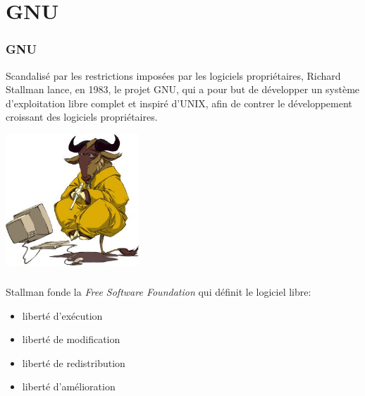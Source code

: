 \documentclass[svgnames,11pt]{beamer}
\begin{document}
\section{GNU}
\begin{frame}
    \frametitle{GNU}

    Scandalisé par les restrictions imposées par les logiciels propriétaires, Richard Stallman lance, en 1983, le projet GNU, qui a pour but de développer un système d'exploitation libre complet et inspiré d'UNIX, afin de contrer le développement croissant des logiciels propriétaires.
\begin{center}
\centering
\includegraphics[width=5cm]{ressources/gnu.jpg}
\label{IMG}
\end{center}
\end{frame}
\begin{frame}
    \frametitle{}
    Stallman fonde la \emph{Free Software Foundation} qui définit le logiciel libre:
    \begin{itemize}
        \item liberté d'exécution
        \item liberté de modification
        \item liberté de redistribution
        \item liberté d'amélioration
    \end{itemize}
\end{frame}
\end{document}
